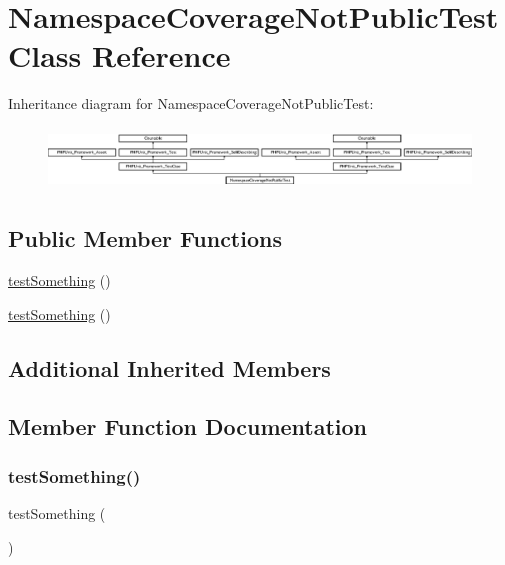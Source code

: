 \hypertarget{class_namespace_coverage_not_public_test}{}\section{Namespace\+Coverage\+Not\+Public\+Test Class Reference}
\label{class_namespace_coverage_not_public_test}
Inheritance diagram for Namespace\+Coverage\+Not\+Public\+Test\+:\begin{figure}[H]
\begin{center}
\leavevmode
\includegraphics[height=1.651917cm]{class_namespace_coverage_not_public_test}
\end{center}
\end{figure}
\subsection*{Public Member Functions}
\begin{DoxyCompactItemize}
\item 
\mbox{\hyperlink{class_namespace_coverage_not_public_test_a0fc4e17369bc9607ebdd850d9eda8167}{test\+Something}} ()
\item 
\mbox{\hyperlink{class_namespace_coverage_not_public_test_a0fc4e17369bc9607ebdd850d9eda8167}{test\+Something}} ()
\end{DoxyCompactItemize}
\subsection*{Additional Inherited Members}


\subsection{Member Function Documentation}
\mbox{\label{class_namespace_coverage_not_public_test_a0fc4e17369bc9607ebdd850d9eda8167}} 
\subsubsection{\texorpdfstring{test\+Something()}{testSomething()}\hspace{0.1cm}{\footnotesize\ttfamily [1/2]}}
{\footnotesize\ttfamily test\+Something (\begin{DoxyParamCaption}{ }\end{DoxyParamCaption})}

